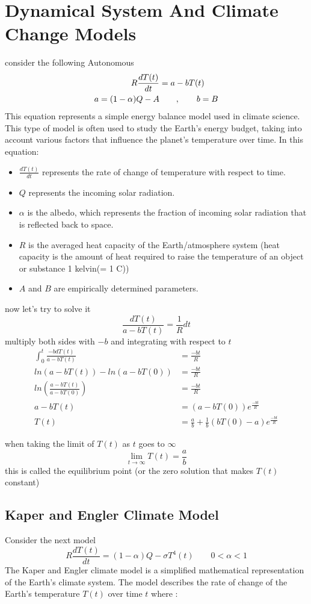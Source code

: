 \documentclass[]{article}
\begin{document}
\section{Dynamical System And Climate Change Models}

consider the following Autonomous
\begin{align*}
    R \frac{dT(t)}{dt} &= a - bT(t)
    \\
    a = (1-\alpha)Q-A &\quad\quad,\quad\quad b = B 
\end{align*}
This equation represents a simple energy balance model used in climate science.
This type of model is often used to study the Earth's energy budget, 
taking into account various factors that influence the planet's temperature over time. 
In this equation:
\begin{itemize}
    \item $\displaystyle \frac{dT(t)}{dt}$ represents the rate of change of temperature with respect to time.
    \item $Q$ represents the incoming solar radiation.
    \item $\alpha$ is the albedo, which represents the fraction of incoming solar radiation that is reflected back to space.
    \item $R$ is the averaged heat capacity of the Earth/atmosphere
    system (heat capacity is the amount of heat required to raise the temperature of an object or substance 1 kelvin(= 1 C))
    \item $A$ and $B$ are empirically determined parameters.
\end{itemize}
now let's try to solve it 
\[
\frac{dT(t)}{a - bT(t)} = \frac{1}{R} dt
\]
multiply both sides with $-b$ and integrating with respect to $t$
\begin{align*}
    \int_{0}^{t} \frac{-b dT(t)}{a - bT(t)} &= \frac{-bt}{R}    
    \\
    ln(a - bT(t)) - ln(a - bT(0)) &= \frac{-bt}{R}
\\
ln \left(\frac{a - bT(t)}{a - bT(0)}\right) &= \frac{-bt}{R}
\\
a - bT(t) &= (a - bT(0))e^{\frac{-bt}{R}}
\\
T(t) &= \frac{a}{b} + \frac{1}{b}(bT(0)-a)e^{\frac{-bt}{R}}
\end{align*}

when taking the limit of $T(t)$ as $t$ goes to $\infty$
\[
\lim_{t \to \infty} T(t) = \frac{a}{b}
\]
this is called the equilibrium point (or the zero solution that makes $T(t)$ constant)
\subsection{Kaper and Engler Climate Model}
Consider the next model
\[
R \frac{dT(t)}{dt} = (1-\alpha)Q - \sigma T^4(t) \qquad 0<\alpha <1
\]
The Kaper and Engler climate model is a simplified mathematical representation of the Earth's climate system. 
The model describes the rate of change of the Earth's temperature $T(t)$ over time $t$ where :
\end{document}
